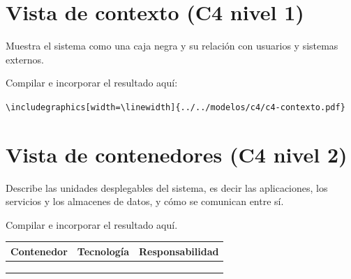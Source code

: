 \documentclass[11pt,a4paper]{article}
\begin{document}
\section{Vista de contexto (C4 nivel 1)}

Muestra el sistema como una caja negra y su relación con usuarios y sistemas
externos.

\begin{porcompletar}
Compilar  e incorporar el resultado aquí:

\vspace{4pt}
\texttt{\textbackslash includegraphics[width=\textbackslash linewidth]\{../../modelos/c4/c4-contexto.pdf\}}
\end{porcompletar}

\begin{porcompletar}
\end{porcompletar}

\section{Vista de contenedores (C4 nivel 2)}

Describe las unidades desplegables del sistema, es decir las aplicaciones, los
servicios y los almacenes de datos, y cómo se comunican entre sí.

\begin{porcompletar}
Compilar  e incorporar el resultado aquí.
\end{porcompletar}

\begin{center}
\begin{tabularx}{\linewidth}{@{}L{3.4cm} L{3.2cm} Y@{}}
\toprule
\sffamily\bfseries\color{lgPrimario}Contenedor &
\sffamily\bfseries\color{lgPrimario}Tecnología &
\sffamily\bfseries\color{lgPrimario}Responsabilidad \\
\midrule
{} &  &  \\
            &  &  \\
  &  &  \\
\bottomrule
\end{tabularx}
\end{center}
\end{document}
